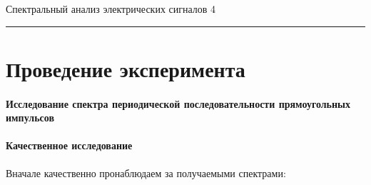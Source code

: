 \documentclass[12pt,a4paper]{scrartcl}
\begin{document}
	\begin{flushleft}
		\footnotesize{Спектральный анализ электрических сигналов} \hspace{\fill} \footnotesize{4}
		\\[-0.3cm]\noindent\rule{\textwidth}{0.3pt}
	\end{flushleft}
	
	\section{Проведение эксперимента}
	
	\paragraph{Исследование спектра периодической последовательности прямоугольных импульсов} \hfill
	
	\paragraph{Качественное исследование} \hfill
	
	Вначале качественно пронаблюдаем за получаемыми спектрами:
	
\end{document}
